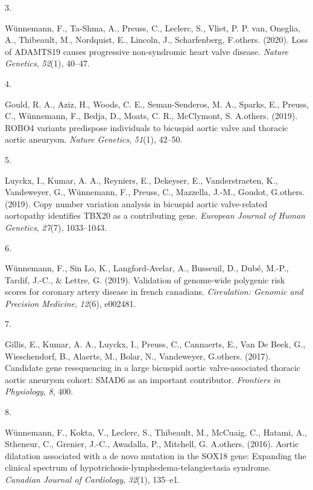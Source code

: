 \documentclass[11pt,a4paper,]{awesome-cv}
\newlength{\csllabelwidth}
\newcommand{\CSLLeftMargin}[1]{\parbox[t]{\csllabelwidth}{#1}}
\newcommand{\CSLRightInline}[1]{\parbox[t]{\linewidth - \csllabelwidth}{#1}}
\begin{document}
\leavevmode{}%
\CSLLeftMargin{3. }
\CSLRightInline{Wünnemann, F., Ta-Shma, A., Preuss, C., Leclerc, S.,
Vliet, P. P. van, Oneglia, A., Thibeault, M., Nordquist, E., Lincoln,
J., Scharfenberg, F.others. (2020). Loss of ADAMTS19 causes progressive
non-syndromic heart valve disease. \emph{Nature Genetics}, \emph{52}(1),
40--47.}

\leavevmode{}%
\CSLLeftMargin{4. }
\CSLRightInline{Gould, R. A., Aziz, H., Woods, C. E., Seman-Senderos, M.
A., Sparks, E., Preuss, C., Wünnemann, F., Bedja, D., Moats, C. R.,
McClymont, S. A.others. (2019). ROBO4 variants predispose individuals to
bicuspid aortic valve and thoracic aortic aneurysm. \emph{Nature
Genetics}, \emph{51}(1), 42--50.}

\leavevmode{}%
\CSLLeftMargin{5. }
\CSLRightInline{Luyckx, I., Kumar, A. A., Reyniers, E., Dekeyser, E.,
Vanderstraeten, K., Vandeweyer, G., Wünnemann, F., Preuss, C., Mazzella,
J.-M., Goudot, G.others. (2019). Copy number variation analysis in
bicuspid aortic valve-related aortopathy identifies TBX20 as a
contributing gene. \emph{European Journal of Human Genetics},
\emph{27}(7), 1033--1043.}

\leavevmode{}%
\CSLLeftMargin{6. }
\CSLRightInline{Wünnemann, F., Sin Lo, K., Langford-Avelar, A.,
Busseuil, D., Dubé, M.-P., Tardif, J.-C., \& Lettre, G. (2019).
Validation of genome-wide polygenic risk scores for coronary artery
disease in french canadians. \emph{Circulation: Genomic and Precision
Medicine}, \emph{12}(6), e002481.}

\leavevmode{}%
\CSLLeftMargin{7. }
\CSLRightInline{Gillis, E., Kumar, A. A., Luyckx, I., Preuss, C.,
Cannaerts, E., Van De Beek, G., Wieschendorf, B., Alaerts, M., Bolar,
N., Vandeweyer, G.others. (2017). Candidate gene resequencing in a large
bicuspid aortic valve-associated thoracic aortic aneurysm cohort: SMAD6
as an important contributor. \emph{Frontiers in Physiology}, \emph{8},
400.}

\leavevmode{}%
\CSLLeftMargin{8. }
\CSLRightInline{Wünnemann, F., Kokta, V., Leclerc, S., Thibeault, M.,
McCuaig, C., Hatami, A., Stheneur, C., Grenier, J.-C., Awadalla, P.,
Mitchell, G. A.others. (2016). Aortic dilatation associated with a de
novo mutation in the SOX18 gene: Expanding the clinical spectrum of
hypotrichosis-lymphedema-telangiectasia syndrome. \emph{Canadian Journal
of Cardiology}, \emph{32}(1), 135--e1.}
\end{document}
